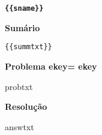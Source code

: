 \documentclass{article}
\begin{document}
{\centering\bf \verb"{{sname}}" }

\noindent\textbf{Sumário}

\begin{verbatim}
{{summtxt}}
\end{verbatim}

\noindent\textbf{Problema ekey={{ ekey }} }

{{probtxt}}

\noindent\textbf{Resolução}

{{answtxt}}
\end{document}
